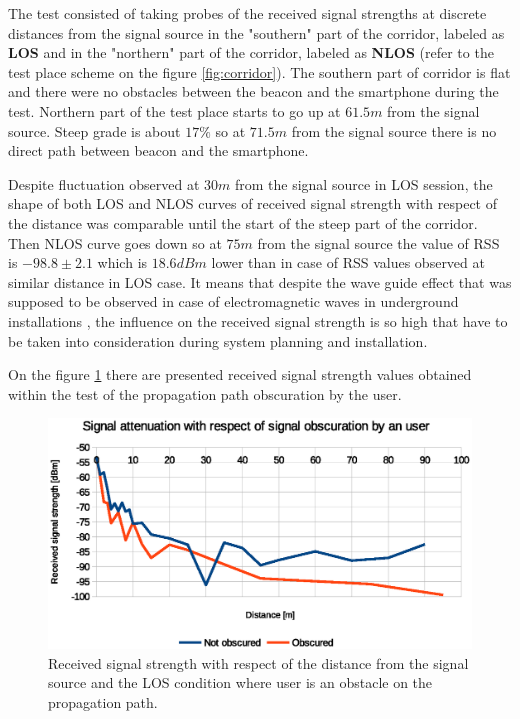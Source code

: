 \documentclass[../main.tex]{subfiles}
\begin{document}
The test consisted of taking probes of the received signal strengths at discrete distances from the signal source in the "southern" part of the corridor, labeled as \textbf{LOS} and in the "northern" part of the corridor, labeled as \textbf{NLOS} (refer to the test place scheme on the figure \ref{fig:corridor}). The southern part of corridor is flat and there were no obstacles between the beacon and the smartphone during the test. Northern part of the test place starts to go up at $61.5 m$ from the signal source. Steep grade is about $17\%$ so at $71.5 m$ from the signal source there is no direct path between beacon and the smartphone.

Despite fluctuation observed at $30 m$ from the signal source in LOS session, the shape of both LOS and NLOS curves of received signal strength with respect of the distance was comparable until the start of the steep part of the corridor. Then NLOS curve goes down so at $75m$ from the signal source the value of RSS is $-98.8\pm2.1$ which is $18.6dBm$ lower than in case of RSS values observed at similar distance in LOS case. It means that despite the wave guide effect that was supposed to be observed in case of electromagnetic waves in underground installations \cite{rf_in_tunnel_waveguide_effect}\cite{article_rf_propagation_practical_full}, the influence on the received signal strength is so high that have to be taken into consideration during system planning and installation.

On the figure \ref{fig:tests_case5_user_shadowing} there are presented received signal strength values obtained within the test of the propagation path obscuration by the user.

\begin{figure}[!htbp]
\includegraphics[width=\textwidth, keepaspectratio]{pictures/tests_case5_user_shadowing}
\centering
\caption{Received signal strength with respect of the distance from the signal source and the LOS condition where user is an obstacle on the propagation path.}
\label{fig:tests_case5_user_shadowing}
\end{figure}
\end{document}
